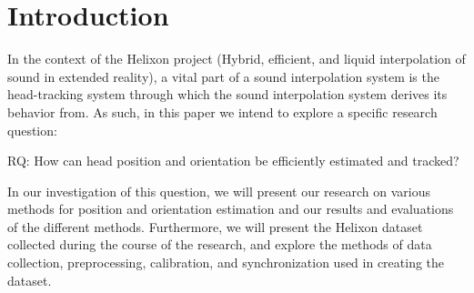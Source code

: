 \chapter{Introduction}
In the context of the Helixon project (Hybrid, efficient, and liquid interpolation of sound in extended reality), a vital part of a sound interpolation system is the head-tracking system through which the sound interpolation system derives its behavior from. As such, in this paper we intend to explore a specific research question:\par
RQ: How can head position and orientation be efficiently estimated and tracked? \par
In our investigation of this question, we will present our research on various methods for position and orientation estimation and our results and evaluations of the different methods. Furthermore, we will present the Helixon dataset collected during the course of the research, and explore the methods of data collection, preprocessing, calibration, and synchronization used in creating the dataset.
